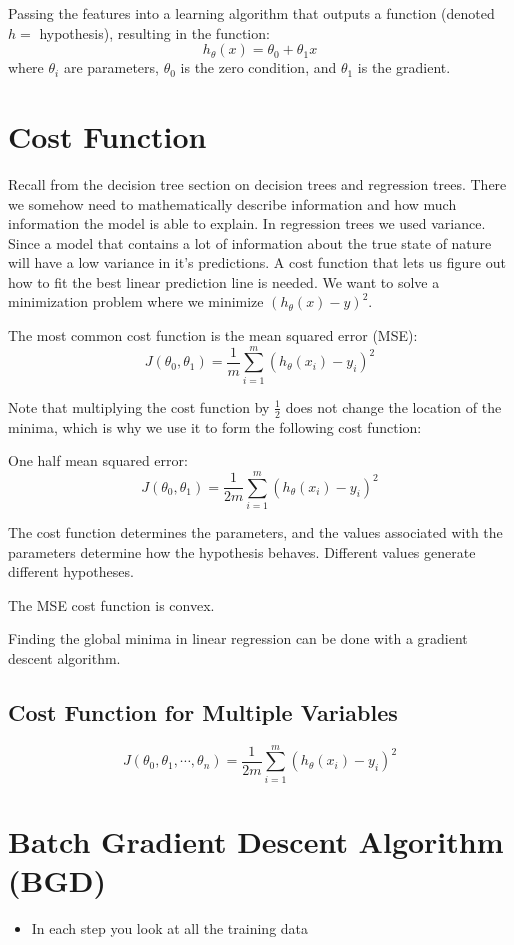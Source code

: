 Passing the features into a learning algorithm that outputs a function (denoted $h = $ hypothesis), resulting in the function:
\[
    h_\theta(x) = \theta_0+\theta_1 x
\]
where $\theta_i$ are parameters, $\theta_0$ is the zero condition, and $\theta_1$ is the gradient.

\section{Cost Function}
Recall from the decision tree section on decision trees and regression trees.
There we somehow need to mathematically describe information and how much 
information the model is able to explain. In regression trees we used variance.
Since a model that contains a lot of information about the true state of nature
will have a low variance in it's predictions. A cost function that lets us 
figure out how to fit the best linear prediction line is needed.
We want to solve a minimization problem where we minimize $(h_\theta(x)-y)^2$.

The most common cost function is the mean squared error (MSE):
\[
    J(\theta_0, \theta_1) = \frac{1}{m}\sum_{i=1}^m\left(h_\theta(x_i)-y_i\right)^2
\]

Note that multiplying the cost function by $\frac{1}{2}$ does not change the location of the minima, which is why we use it to form the following cost function:
\bigskip

One half mean squared error:
\[
    J(\theta_0, \theta_1) = \frac{1}{2m}\sum_{i=1}^m\left(h_\theta(x_i)-y_i\right)^2
\]

The cost function determines the parameters, and the values associated with the parameters determine how the hypothesis behaves.
Different values generate different hypotheses.

The MSE cost function is convex.

Finding the global minima in linear regression can be done with a gradient descent algorithm.

\subsection{Cost Function for Multiple Variables}
\[
    J(\theta_0, \theta_1, \cdots, \theta_n) = \frac{1}{2m}\sum_{i=1}^m\left(h_\theta(x_i)-y_i\right)^2
\]

\section{Batch Gradient Descent Algorithm (BGD)}
\begin{itemize}
    \item In each step you look at all the training data
\end{itemize}

